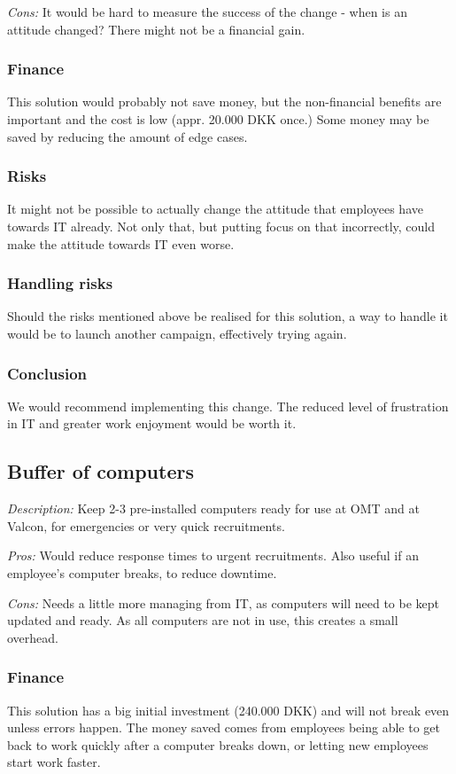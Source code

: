 \emph{Cons:} It would be hard to measure the success of the change - when is an attitude changed?
There might not be a financial gain.

\subsubsection{Finance} 
This solution would probably not save money, but the non-financial benefits are important and the cost is low (appr. 20.000 DKK once.)
Some money may be saved by reducing the amount of edge cases.

\subsubsection{Risks}
It might not be possible to actually change the attitude that employees have towards IT already. Not only that, but putting focus on that incorrectly, could make the attitude towards IT even worse.

\subsubsection{Handling risks}
Should the risks mentioned above be realised for this solution, a way to handle it would be to launch another campaign, effectively trying again. 

\subsubsection{Conclusion} 
We would recommend implementing this change. 
The reduced level of frustration in IT and greater work enjoyment would be worth it.

\subsection{Buffer of computers}
\emph{Description:} Keep 2-3 pre-installed computers ready for use at OMT and at Valcon, for emergencies or very quick recruitments.

\emph{Pros:} Would reduce response times to urgent recruitments.
Also useful if an employee's computer breaks, to reduce downtime.

\emph{Cons:} Needs a little more managing from IT, as
computers will need to be kept updated and ready.
As all computers are not in use, this creates a small overhead.

\subsubsection{Finance} 
This solution has a big initial investment (240.000 DKK) and will not break even unless errors happen.
The money saved comes from employees being able to get back to work quickly after a computer breaks down, or letting new employees start work faster.

